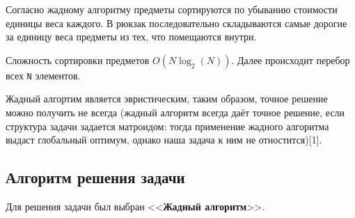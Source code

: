 \documentclass[14pt,a4paper]{extarticle}
\begin{document}
	Согласно жадному алгоритму предметы сортируются по убыванию стоимости единицы веса каждого. В рюкзак последовательно складываются самые дорогие за единицу веса предметы из тех, что помещаются внутри.
	
	Сложность сортировки предметов $O(N\log_2(N))$. Далее происходит перебор всех \texttt{N} элементов.
	
	Жадный алгортим является эвристическим, таким образом, точное решение можно получить не всегда (жадный алгоритм всегда даёт точное решение, если структура задачи задается матроидом: тогда применение жадного алгоритма выдаст глобальный оптимум, однако наша задача к ним не отностится)[1].
	
	
	
	
	
	
	
	
	
	


\subsection{Алгоритм решения задачи}

	Для решения задачи был выбран <<\textbf{Жадный алгоритм}>>.
	
\end{document}
